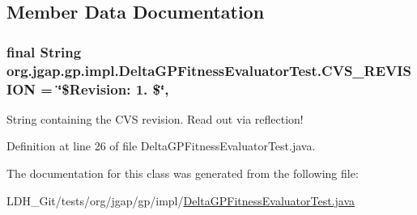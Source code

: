 \subsection{Member Data Documentation}
\hypertarget{classorg_1_1jgap_1_1gp_1_1impl_1_1_delta_g_p_fitness_evaluator_test_ac09a2a84b8c9e1148f8f87c1f5b398c3}{
\subsubsection[{C\-V\-S\-\_\-\-R\-E\-V\-I\-S\-I\-O\-N}]{\setlength{\rightskip}{0pt plus 5cm}final String org.\-jgap.\-gp.\-impl.\-Delta\-G\-P\-Fitness\-Evaluator\-Test.\-C\-V\-S\-\_\-\-R\-E\-V\-I\-S\-I\-O\-N = \char`\"{}\$Revision\-: 1. \$\char`\"{}\hspace{0.3cm}{\ttfamily [static]}, {\ttfamily [private]}}}\label{classorg_1_1jgap_1_1gp_1_1impl_1_1_delta_g_p_fitness_evaluator_test_ac09a2a84b8c9e1148f8f87c1f5b398c3}
String containing the C\-V\-S revision. Read out via reflection! 

Definition at line 26 of file Delta\-G\-P\-Fitness\-Evaluator\-Test.\-java.



The documentation for this class was generated from the following file\-:\begin{DoxyCompactItemize}
\item 
L\-D\-H\-\_\-\-Git/tests/org/jgap/gp/impl/\hyperlink{_delta_g_p_fitness_evaluator_test_8java}{Delta\-G\-P\-Fitness\-Evaluator\-Test.\-java}\end{DoxyCompactItemize}
